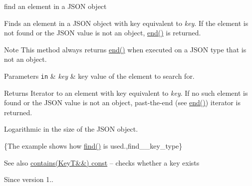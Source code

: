 find an element in a J\+S\+ON object 

Finds an element in a J\+S\+ON object with key equivalent to {\itshape key}. If the element is not found or the J\+S\+ON value is not an object, \hyperlink{classnlohmann_1_1basic__json_a931267ec3f09eb67e4382f321b2c52bc}{end()} is returned.

\begin{DoxyNote}{Note}
This method always returns \hyperlink{classnlohmann_1_1basic__json_a931267ec3f09eb67e4382f321b2c52bc}{end()} when executed on a J\+S\+ON type that is not an object.
\end{DoxyNote}

\begin{DoxyParams}[1]{Parameters}
\mbox{\tt in}  & {\em key} & key value of the element to search for.\\
\hline
\end{DoxyParams}
\begin{DoxyReturn}{Returns}
Iterator to an element with key equivalent to {\itshape key}. If no such element is found or the J\+S\+ON value is not an object, past-\/the-\/end (see \hyperlink{classnlohmann_1_1basic__json_a931267ec3f09eb67e4382f321b2c52bc}{end()}) iterator is returned.
\end{DoxyReturn}
Logarithmic in the size of the J\+S\+ON object.

\{The example shows how {\ttfamily \hyperlink{classnlohmann_1_1basic__json_acdf9b3aab82dcf443dd91ca5ec06b80c}{find()}} is used.,find\+\_\+\+\_\+key\+\_\+type\}

\begin{DoxySeeAlso}{See also}
\hyperlink{classnlohmann_1_1basic__json_a2a8dc024698f32cf8b01b2de93835202}{contains(\+Key\+T\&\&) const} -- checks whether a key exists
\end{DoxySeeAlso}
\begin{DoxySince}{Since}
version 1.. 
\end{DoxySince}
